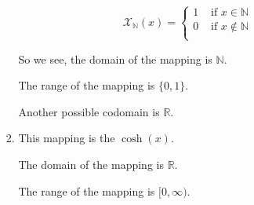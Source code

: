 \documentclass[12pt,letterpaper]{article}
\begin{document}
\begin{enumerate}
\begin{enumerate}
\begin{enumerate}
              \[
                \mathcal{X}_\mathbb{N}(x)
                =
                \begin{cases}
                  1 & \text{ if } x \in \mathbb{N} \\
                  0 & \text{ if } x \notin \mathbb{N} \\
                \end{cases}
              \]

              So we see,
              the domain of the mapping is $\mathbb{N}$.

              The range of the mapping is $\{0, 1\}$.

              Another possible codomain is $\mathbb{R}$.
            \item
              This mapping is the $\cosh(x)$.

              The domain of the mapping is $\mathbb{R}$.

              The range of the mapping is $[0, \infty)$.


\end{enumerate}
\end{enumerate}
\end{enumerate}
\end{document}

